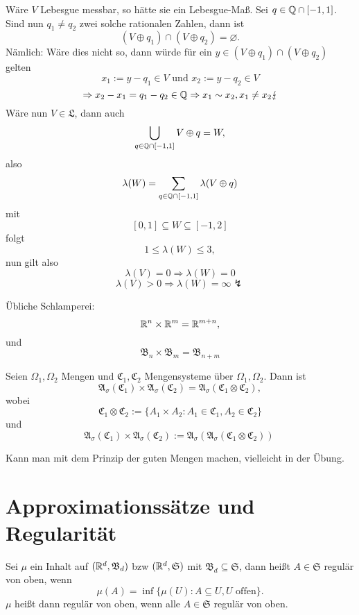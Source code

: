 			\begin{bew}
				Wäre $V$ Lebesgue messbar, so hätte sie ein Lebesgue-Maß. Sei $q\in\mathbb{Q}\cap[-1,1]$. Sind nun $q_1\neq q_2$ zwei solche rationalen Zahlen, dann ist
				\[ (V\oplus q_1)\cap (V\oplus q_2)=\varnothing. \]
				Nämlich: Wäre dies nicht so, dann würde für ein $y\in(V\oplus q_1)\cap (V\oplus q_2)$ gelten
				\[ x_1:=y-q_1\in V\text{ und } x_2:=y-q_2\in V \]
				\[ \Rightarrow x_2-x_1=q_1-q_2\in \mathbb{Q}\Rightarrow x_1\sim x_2, x_1\neq x_2\lightning \]
				Wäre nun $V\in\mathfrak{L}$, dann auch
				\[ \bigcup_{q\in\mathbb{Q}\cap[-1,1]}V\oplus q=W, \]
				also
				\[ \lambda(W)=\sum_{q\in\mathbb{Q}\cap[-1,1]}\lambda(V\oplus q) \]
				mit 
				\[ [0,1]\subseteq W\subseteq[-1,2] \]
				folgt
				\[ 1\le\lambda(W)\le 3, \]
				nun gilt also
				\[ \lambda(V)=0\Rightarrow \lambda(W)=0 \]
				\[ \lambda(V)>0\Rightarrow\lambda(W)=\infty  \lightning \]
			\end{bew}
			
			\begin{bem}
				Übliche Schlamperei:
				\[ \mathbb{R}^n\times\mathbb{R}^m=\mathbb{R}^{m+n},  \]
				und
				\[ \mathfrak{B}_n\times\mathfrak{B}_m=\mathfrak{B}_{n+m} \]
			\end{bem}
			
			\begin{satz}
				Seien $\Omega_1,\Omega_2$ Mengen und $\mathfrak{C}_1, \mathfrak{C}_2$ Mengensysteme über $\Omega_1,\Omega_2$. Dann ist
				\[ \mathfrak{A}_\sigma(\mathfrak{C}_1)\times \mathfrak{A}_\sigma(\mathfrak{C}_2)=\mathfrak{A}_\sigma(\mathfrak{C}_1\otimes\mathfrak{C}_2), \]
				wobei
				\[ \mathfrak{C}_1\otimes\mathfrak{C}_2:=\{A_1\times A_2: A_1\in \mathfrak{C}_1, A_2\in\mathfrak{C}_2\} \]
				und
				\[ \mathfrak{A}_\sigma(\mathfrak{C}_1)\times\mathfrak{A}_\sigma(\mathfrak{C}_2):=\mathfrak{A}_\sigma(\mathfrak{A}_\sigma(\mathfrak{C}_1\otimes\mathfrak{C}_2))\ \]
			\end{satz}
			
			\begin{bew}
				Kann man mit dem Prinzip der guten Mengen machen, vielleicht in der Übung. 
			\end{bew}
			
		\section{Approximationssätze und Regularität}
			
			\begin{defi}
				Sei $\mu$ ein Inhalt auf $(\mathbb{R}^d, \mathfrak{B}_d)$ bzw $(\mathbb{R}^d, \mathfrak{S})$ mit $\mathfrak{B}_d\subseteq\mathfrak{S}$, dann heißt $A\in\mathfrak{S}$ regulär von oben, wenn
				\[ \mu(A)=\inf\{\mu(U):A\subseteq U, U\text{ offen}\}. \]
				$\mu$ heißt dann regulär von oben, wenn alle $A\in\mathfrak{S}$ regulär von oben. 
			\end{defi}
			
